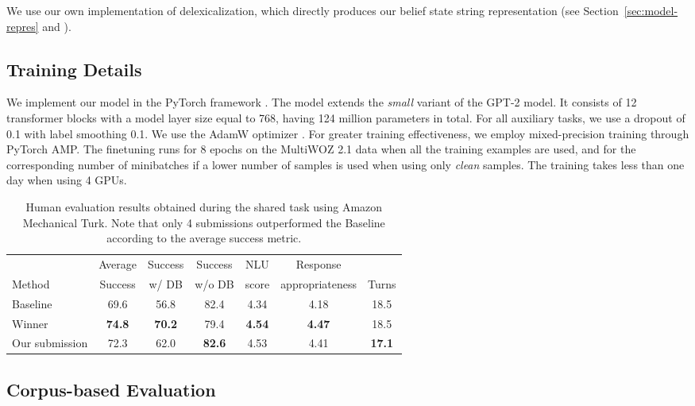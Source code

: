 \documentclass[11pt,a4paper]{article}
\newcommand{\multiwozn}[0]{MultiWOZ 2.1\xspace}
\begin{document}
We use our own implementation of delexicalization, which directly produces our belief state string representation (see Section~\ref{sec:model-repres} and ). 


\subsection{Training Details}

We implement our model in the PyTorch framework \cite{pytorch}.
The model extends the \emph{small} variant of the GPT-2 model.
It consists of 12 transformer blocks with a model layer size equal to 768, having 124 million parameters in total.
For all auxiliary tasks, we use a dropout of 0.1 with label smoothing 0.1.
We use the AdamW optimizer \cite{loshchilov2017decoupled}.
For greater training effectiveness, we employ mixed-precision training \cite{micikevicius2017} through PyTorch AMP. 
The finetuning runs for 8 epochs on the \multiwozn data when all the training examples are used, and for the corresponding number of minibatches if a lower number of samples is used when using only \emph{clean} samples.
The training takes less than one day when using 4 GPUs.

\begin{table*}[t]
    \centering\small
    \begin{tabular}{lcccccc}
      \toprule
      & Average & Success & Success  & NLU &  Response & \\
      Method & Success & w/ DB & w/o DB & score & appropriateness & Turns \\
      \midrule
      Baseline & 69.6 & 56.8 & 82.4 & 4.34 & 4.18 & 18.5 \\
      Winner & \textbf{74.8} & \textbf{70.2} & 79.4 & \textbf{4.54 }& \textbf{4.47} & 18.5 \\
      Our submission & 72.3 & 62.0 & \textbf{82.6} & 4.53 & 4.41 & \textbf{17.1} \\
      \bottomrule
    \end{tabular}
    \caption{Human evaluation results obtained during the shared task using Amazon Mechanical Turk. Note that only 4 submissions outperformed the Baseline according to the average success metric.}
    \label{tab:human}
\end{table*}

\subsection{Corpus-based Evaluation}
\label{sec:corpus-based}
\end{document}
